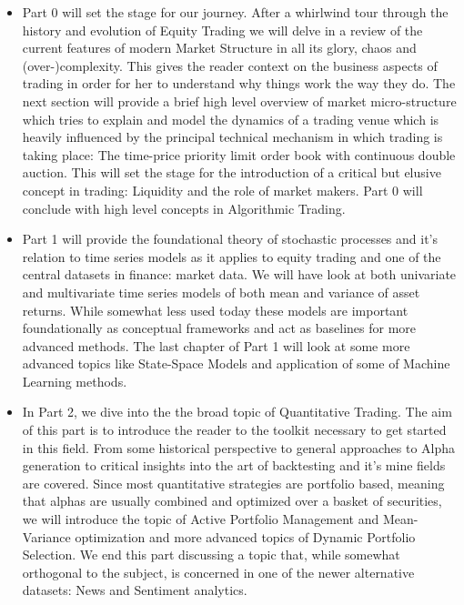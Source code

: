 \begin{itemize}
\item Part 0 will set the stage for our journey. After a whirlwind tour through the history and evolution of Equity Trading we will delve in a review of the current features of modern Market Structure in all its glory, chaos and (over-)complexity. This gives the reader context on the business aspects of trading in order for her to understand why things work the way they do. The next section will provide a brief high level overview of market micro-structure which tries to explain and model the dynamics of a trading venue which is heavily influenced by the principal technical mechanism in which trading is taking place: The time-price priority limit order book with  continuous double auction. This will set the stage for the introduction of a critical but elusive concept in trading: Liquidity and the role of market makers. Part 0 will conclude with high level concepts in Algorithmic Trading.

\item Part 1 will provide the foundational theory of stochastic processes and it's relation to time series models as it applies to equity trading and one of the central datasets in finance: market data. We will have look at both univariate and multivariate time series models of both mean and variance of asset returns. While somewhat less used today these models are important foundationally as conceptual frameworks and act as baselines for more advanced methods. The last chapter of Part 1 will look at some more advanced topics like State-Space Models and application of some of Machine Learning methods.

\item In Part 2, we dive into the the broad topic of Quantitative Trading. The aim of this part is to introduce the reader to the toolkit necessary to get started in this field. From some historical perspective to general approaches to Alpha generation to critical insights into the art of backtesting and it's mine fields are covered. Since most quantitative strategies are portfolio based, meaning that alphas are usually  combined  and optimized over a basket of securities, we will introduce the topic of Active Portfolio Management and Mean-Variance optimization and more advanced topics of Dynamic Portfolio Selection. We end this part discussing a topic that, while somewhat orthogonal to the subject, is concerned in one of the newer alternative datasets: News and Sentiment analytics.


\end{itemize}
